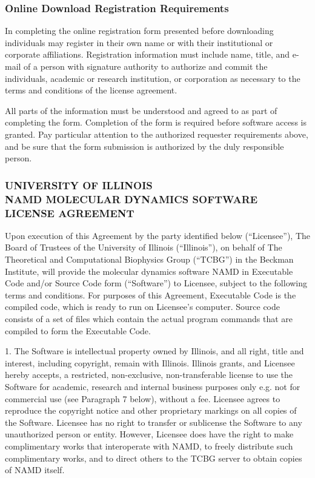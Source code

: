 \subsubsection*{Online Download Registration Requirements}

In completing the online registration form presented before downloading
individuals may register in their own name or with their institutional or
corporate affiliations. Registration information must include name, title, 
and e-mail of a person with signature authority to authorize and commit the
individuals, academic or research institution, or corporation as necessary 
to the terms and conditions of the license agreement.

All parts of the information must be understood and agreed to as part of
completing the form. Completion of the form is required before software 
access is granted. Pay particular attention to the authorized requester 
requirements above, and be sure that the form submission is authorized 
by the duly responsible person.

\newpage
\subsubsection*{UNIVERSITY OF ILLINOIS \\
NAMD MOLECULAR DYNAMICS SOFTWARE LICENSE AGREEMENT}

Upon execution of this Agreement by the party identified below (``Licensee''),
The Board of Trustees of the University of Illinois (``Illinois''), on 
behalf of The Theoretical and Computational Biophysics Group (``TCBG'') in the Beckman Institute,
will provide the molecular dynamics software NAMD in Executable 
Code and/or Source Code form (``Software'') to Licensee, subject to 
the following terms and conditions. For purposes of this Agreement, 
Executable Code is the compiled code, which is ready to run on Licensee's 
computer. Source code consists of a set of files which contain the 
actual program commands that are compiled to form the Executable Code.

1. The Software is intellectual property owned by Illinois, and all 
right, title and interest, including copyright, remain with Illinois. 
Illinois grants, and Licensee hereby accepts, a restricted, non-exclusive, 
non-transferable license to use the Software for academic, research 
and internal business purposes only e.g. not for commercial use 
(see Paragraph 7 below), without a fee. Licensee agrees to reproduce 
the copyright notice and other proprietary markings on all copies of 
the Software. Licensee has no right to transfer or sublicense the 
Software to any unauthorized person or entity. However, Licensee does 
have the right to make complimentary works that interoperate with NAMD, 
to freely distribute such complimentary works, and to direct others 
to the TCBG server to obtain copies of NAMD itself.

